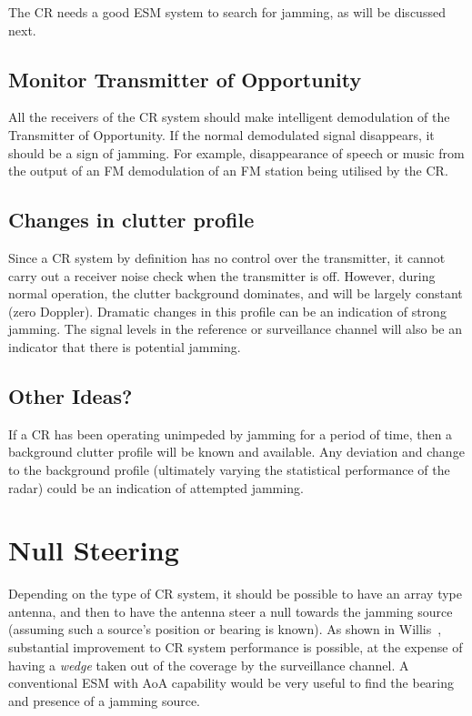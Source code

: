 \documentclass[english, 12pt]{report}
\begin{document}
The CR needs a good ESM system to search for jamming, as will be discussed next.

\subsection{Monitor Transmitter of Opportunity}

All the receivers of the CR system should make intelligent demodulation of the Transmitter of Opportunity. If the normal demodulated signal disappears, it should be a sign of jamming. For example, disappearance of speech or music from the output of an FM demodulation of an FM station being utilised by the CR.

\subsection {Changes in clutter profile}

Since a CR system by definition has no control over the transmitter, it cannot carry out a receiver noise check when the transmitter is off. However, during normal operation, the clutter background dominates, and will be largely constant (zero Doppler). Dramatic changes in this profile can be an indication of strong jamming. The signal levels in the reference or surveillance channel will also be an indicator that there is potential jamming.

\subsection{Other Ideas?}


If a CR has been operating unimpeded by jamming for a period of time, then a background clutter profile will be known and available. Any deviation and change to the background profile (ultimately varying the statistical performance of the radar) could be an indication of attempted jamming.   


\section{Null Steering}\label{sec:nullsteer}

Depending on the type of CR system, it should be possible to have an array type antenna, and then to have the antenna steer a null towards the jamming source (assuming such a source's position or bearing is known). As shown in Willis~\cite{willis:07}, substantial improvement to CR system performance is possible, at the expense of having a \emph{wedge} taken out of the coverage by the surveillance channel. A conventional ESM with AoA capability would be very useful to find the bearing and presence of a jamming source.
\end{document}
